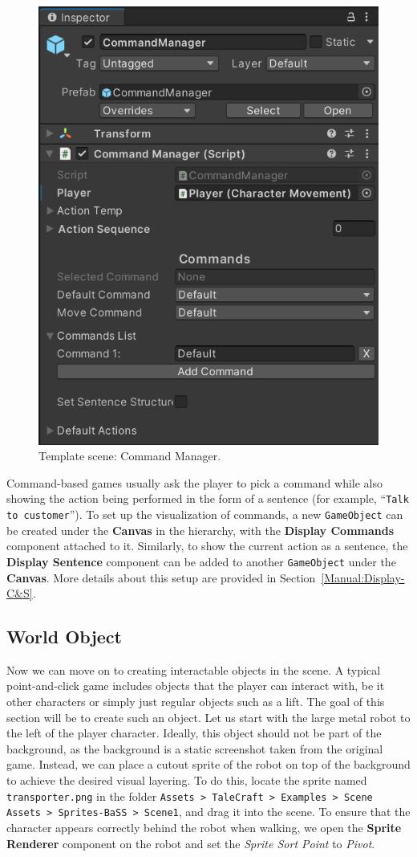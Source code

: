 \begin{figure}[H]
\centering
\includegraphics[width=0.6\linewidth]{img/User doc/image_2025-07-08_214350710.png}
\caption{Template scene: Command Manager.}
\label{fig:Tutorial-template:CM}
\end{figure}

Command-based games usually ask the player to pick a command while also showing the action being performed in the form of a sentence (for example, “\verb|Talk to customer|”). To set up the visualization of commands, a new \verb|GameObject| can be created under the \textbf{Canvas} in the hierarchy, with the \textbf{Display Commands} component attached to it. Similarly, to show the current action as a sentence, the \textbf{Display Sentence} component can be added to another \verb|GameObject| under the \textbf{Canvas}. More details about this setup are provided in Section~\ref{Manual:Display-C&S}.

\subsection{World Object}
Now we can move on to creating interactable objects in the scene. A typical point-and-click game includes objects that the player can interact with, be it other characters or simply just regular objects such as a lift. The goal of this section will be to create such an object. Let us start with the large metal robot to the left of the player character. Ideally, this object should not be part of the background, as the background is a static screenshot taken from the original game. Instead, we can place a cutout sprite of the robot on top of the background to achieve the desired visual layering. To do this, locate the sprite named \verb|transporter.png| in the folder \texttt{Assets > TaleCraft > Examples > Scene Assets > Sprites-BaSS > Scene1}, and drag it into the scene. To ensure that the character appears correctly behind the robot when walking, we open the \textbf{Sprite Renderer} component on the robot and set the \textit{Sprite Sort Point} to \textit{Pivot}.

